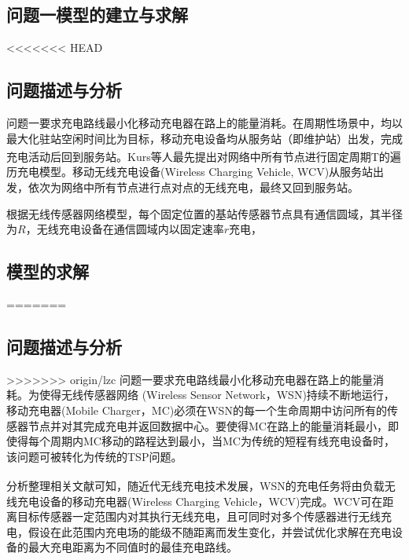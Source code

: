\documentclass{whutmod}
\newcommand{\upcite}[1]{\textsuperscript{\cite{#1}}}
\begin{document}
\begin{table}[H]
\begin{tablenotes}
	\section{问题一模型的建立与求解}
<<<<<<< HEAD
		\subsection{问题描述与分析}


			问题一要求充电路线最小化移动充电器在路上的能量消耗。在周期性场景中，均以最大化驻站空闲时间比为目标，移动充电设备均从服务站（即维护站）出发，完成充电活动后回到服务站。Kurs等人\upcite{4}最先提出对网络中所有节点进行固定周期T的遍历充电模型。移动无线充电设备(Wireless Charging Vehicle, WCV)从服务站出发，依次为网络中所有节点进行点对点的无线充电，最终又回到服务站。
			
			根据无线传感器网络模型，每个固定位置的基站传感器节点具有通信圆域，其半径为$R$，无线充电设备在通信圆域内以固定速率$r$充电，

		\subsection{模型的求解}


%			
%

		
=======
		\subsection{问题描述与分析}		
>>>>>>> origin/lzc
			问题一要求充电路线最小化移动充电器在路上的能量消耗。为使得无线传感器网络
		(Wireless Sensor Network，WSN)持续不断地运行，移动充电器(Mobile Charger，MC)必须在WSN的每一个生命周期中访问所有的传感器节点并对其完成充电并返回数据中心。要使得MC在路上的能量消耗最小，即使得每个周期内MC移动的路程达到最小，当MC为传统的短程有线充电设备时，该问题可被转化为传统的TSP问题。
		    
		    分析整理相关文献可知\upcite{4,5}，随近代无线充电技术发展，WSN的充电任务将由负载无线充电设备的移动充电器(Wireless Charging Vehicle，WCV)完成。WCV可在距离目标传感器一定范围内对其执行无线充电，且可同时对多个传感器进行无线充电，假设在此范围内充电场的能级不随距离而发生变化，并尝试优化求解在充电设备的最大充电距离为不同值时的最佳充电路线。
		    

\end{tablenotes}
\end{table}
\end{document}

